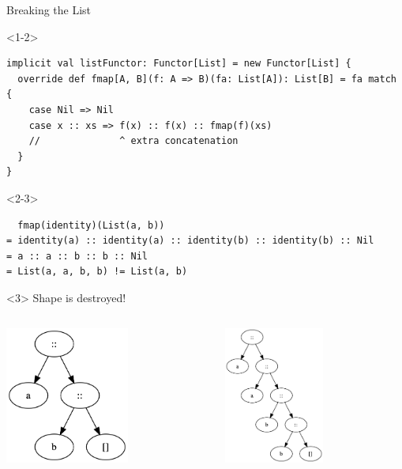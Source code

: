 \documentclass[presentation,aspectratio=169,smaller]{beamer}
\begin{document}
\begin{frame}[label={sec:org3904068},fragile,t]{Breaking the List}
 \begin{onlyenv}<1-2>
\begin{verbatim}
implicit val listFunctor: Functor[List] = new Functor[List] {
  override def fmap[A, B](f: A => B)(fa: List[A]): List[B] = fa match {
    case Nil => Nil
    case x :: xs => f(x) :: f(x) :: fmap(f)(xs)
    //              ^ extra concatenation
  }
}
\end{verbatim}
\end{onlyenv}

\begin{onlyenv}<2-3>
\begin{verbatim}
  fmap(identity)(List(a, b))
= identity(a) :: identity(a) :: identity(b) :: identity(b) :: Nil
= a :: a :: b :: b :: Nil
= List(a, a, b, b) != List(a, b)
\end{verbatim}
\end{onlyenv}

\begin{onlyenv}<3>
Shape is destroyed!

\begin{columns}
\begin{column}[t]{0.5\columnwidth}
\begin{center}
\includegraphics[height=4.5cm]{.dot/functor-list-broken-1.png}
\end{center}
\end{column}

\begin{column}[t]{0.5\columnwidth}
\begin{center}
\includegraphics[height=4.5cm]{.dot/functor-list-broken-2.png}
\end{center}
\end{column}
\end{columns}
\end{onlyenv}
\end{frame}
\end{document}
